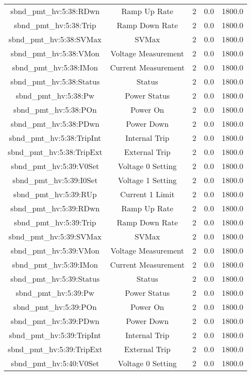 \begin{center}
\begin{longtable}{c | c c c c }
sbnd\_pmt\_hv:5:38:RDwn & Ramp Up Rate & 2 & 0.0 & 1800.0\\ 
sbnd\_pmt\_hv:5:38:Trip & Ramp Down Rate & 2 & 0.0 & 1800.0\\ 
sbnd\_pmt\_hv:5:38:SVMax & SVMax & 2 & 0.0 & 1800.0\\ 
sbnd\_pmt\_hv:5:38:VMon & Voltage Measurement & 2 & 0.0 & 1800.0\\ 
sbnd\_pmt\_hv:5:38:IMon & Current Measurement & 2 & 0.0 & 1800.0\\ 
sbnd\_pmt\_hv:5:38:Status & Status & 2 & 0.0 & 1800.0\\ 
sbnd\_pmt\_hv:5:38:Pw & Power Status & 2 & 0.0 & 1800.0\\ 
sbnd\_pmt\_hv:5:38:POn & Power On & 2 & 0.0 & 1800.0\\ 
sbnd\_pmt\_hv:5:38:PDwn & Power Down & 2 & 0.0 & 1800.0\\ 
sbnd\_pmt\_hv:5:38:TripInt & Internal Trip & 2 & 0.0 & 1800.0\\ 
sbnd\_pmt\_hv:5:38:TripExt & External Trip & 2 & 0.0 & 1800.0\\ 
sbnd\_pmt\_hv:5:39:V0Set & Voltage 0 Setting & 2 & 0.0 & 1800.0\\ 
sbnd\_pmt\_hv:5:39:I0Set & Voltage 1 Setting & 2 & 0.0 & 1800.0\\ 
sbnd\_pmt\_hv:5:39:RUp & Current 1 Limit & 2 & 0.0 & 1800.0\\ 
sbnd\_pmt\_hv:5:39:RDwn & Ramp Up Rate & 2 & 0.0 & 1800.0\\ 
sbnd\_pmt\_hv:5:39:Trip & Ramp Down Rate & 2 & 0.0 & 1800.0\\ 
sbnd\_pmt\_hv:5:39:SVMax & SVMax & 2 & 0.0 & 1800.0\\ 
sbnd\_pmt\_hv:5:39:VMon & Voltage Measurement & 2 & 0.0 & 1800.0\\ 
sbnd\_pmt\_hv:5:39:IMon & Current Measurement & 2 & 0.0 & 1800.0\\ 
sbnd\_pmt\_hv:5:39:Status & Status & 2 & 0.0 & 1800.0\\ 
sbnd\_pmt\_hv:5:39:Pw & Power Status & 2 & 0.0 & 1800.0\\ 
sbnd\_pmt\_hv:5:39:POn & Power On & 2 & 0.0 & 1800.0\\ 
sbnd\_pmt\_hv:5:39:PDwn & Power Down & 2 & 0.0 & 1800.0\\ 
sbnd\_pmt\_hv:5:39:TripInt & Internal Trip & 2 & 0.0 & 1800.0\\ 
sbnd\_pmt\_hv:5:39:TripExt & External Trip & 2 & 0.0 & 1800.0\\ 
sbnd\_pmt\_hv:5:40:V0Set & Voltage 0 Setting & 2 & 0.0 & 1800.0\\ 

\end{longtable}
\end{center}
